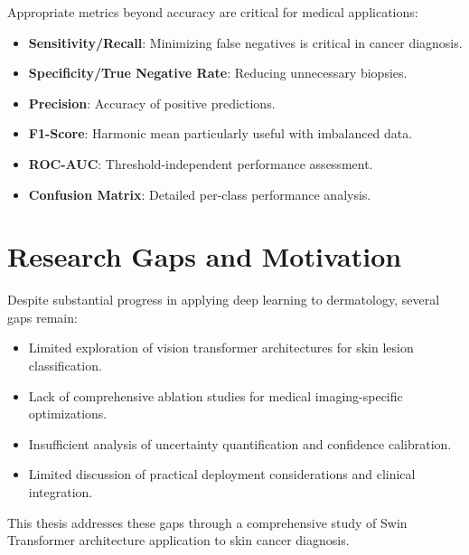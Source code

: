 Appropriate metrics beyond accuracy are critical for medical applications:

\begin{itemize}
    \item \textbf{Sensitivity/Recall}: Minimizing false negatives is critical in cancer diagnosis.
    \item \textbf{Specificity/True Negative Rate}: Reducing unnecessary biopsies.
    \item \textbf{Precision}: Accuracy of positive predictions.
    \item \textbf{F1-Score}: Harmonic mean particularly useful with imbalanced data.
    \item \textbf{ROC-AUC}: Threshold-independent performance assessment.
    \item \textbf{Confusion Matrix}: Detailed per-class performance analysis.
\end{itemize}

\section{Research Gaps and Motivation}

Despite substantial progress in applying deep learning to dermatology, several gaps remain:

\begin{itemize}
    \item Limited exploration of vision transformer architectures for skin lesion classification.
    \item Lack of comprehensive ablation studies for medical imaging-specific optimizations.
    \item Insufficient analysis of uncertainty quantification and confidence calibration.
    \item Limited discussion of practical deployment considerations and clinical integration.
\end{itemize}

This thesis addresses these gaps through a comprehensive study of Swin Transformer architecture application to skin cancer diagnosis.

